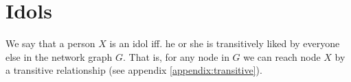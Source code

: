 %
%

\section{Idols}
We say that a person $X$ is an idol iff. he or she is transitively liked by
everyone else in the network graph $G$. That is, for any node in $G$ we can
reach node $X$ by a transitive relationship (see appendix
\ref{appendix:transitive}).

